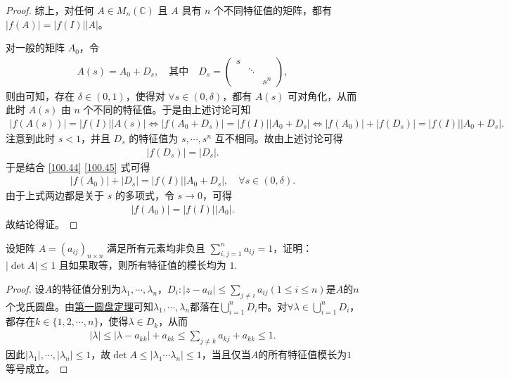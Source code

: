 \documentclass[../../main.tex]{subfiles}%
\begin{document}
\begin{proof}
综上，对任何 $A \in M_n(\mathbb{C})$ 且 $A$ 具有 $n$ 个不同特征值的矩阵，都有 $|f(A)| = |f(I)| |A|$。

对一般的矩阵 $A_0$，令
\begin{align*}
A(s) = A_0 + D_s, \quad \text{其中} \quad D_s = \begin{pmatrix}
s & & \\
& \ddots & \\
& & s^n
\end{pmatrix},
\end{align*}
则由可知，存在 $\delta \in (0, 1)$，使得对 $\forall s \in (0, \delta)$，都有 $A(s)$ 可对角化，从而此时 $A(s)$ 由 $n$ 个不同的特征值。于是由上述讨论可知
\begin{align}
|f(A(s))| = |f(I)| |A(s)| \Longleftrightarrow |f(A_0 + D_s)| = |f(I)| |A_0 + D_s| \Longleftrightarrow |f(A_0)| + |f(D_s)| = |f(I)| |A_0 + D_s|. \label{100.44}
\end{align}
注意到此时 $s < 1$，并且 $D_s$ 的特征值为 $s, \cdots, s^n$ 互不相同。故由上述讨论可得
\begin{align}
|f(D_s)| = |D_s|. \label{100.45}
\end{align}
于是结合 \eqref{100.44} \eqref{100.45} 式可得
\begin{align*}
|f(A_0)| + |D_s| = |f(I)| |A_0 + D_s|, \quad \forall s \in (0, \delta).
\end{align*}
由于上式两边都是关于 $s$ 的多项式，令 $s \rightarrow 0$，可得
\begin{align*}
|f(A_0)| = |f(I)| |A_0|.
\end{align*}
故结论得证。
\end{proof}

\begin{example}
设矩阵 $A = (a_{ij})_{n\times n}$ 满足所有元素均非负且 $\sum_{i,j = 1}^{n} a_{ij} = 1$，证明：$|\det A| \leqslant  1$ 且如果取等，则所有特征值的模长均为 $1$. 
\end{example}
\begin{proof}
设$A$的特征值分别为$\lambda_1,\cdots,\lambda_n$，$D_i:|z-a_{ii}|\leqslant \sum_{j\ne i}a_{ij}(1\leqslant i\leqslant n)$是$A$的$n$个戈氏圆盘。由\hyperref[theorem:第一圆盘定理]{第一圆盘定理}可知$\lambda_1,\cdots,\lambda_n$都落在$\bigcup_{i=1}^n D_i$中。对$\forall \lambda \in \bigcup_{i=1}^n D_i$，都存在$k\in \{1,2,\cdots,n\}$，使得$\lambda \in D_k$，从而
\begin{align*}
|\lambda|\leqslant |\lambda -a_{kk}|+a_{kk}\leqslant \sum_{j\ne k}a_{kj}+a_{kk}\leqslant 1.
\end{align*}
因此$|\lambda_1|,\cdots,|\lambda_n|\leqslant 1$，故$\det A\leqslant |\lambda_1\cdots \lambda_n|\leqslant 1$，当且仅当$A$的所有特征值模长为$1$等号成立。
\end{proof}
\end{document}
